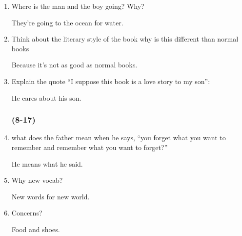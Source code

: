 {}

\begin{multicols}{3}
  \begin{enumerate}
    \subsubsection{(1-7)}

    \item Where is the man and the boy going? Why?
    
    They’re going to the ocean for water.
    
    \item Think about the literary style of the book why is this different than normal books
    
    Because it’s not as good as normal books.

    \item Explain the quote “I suppose this book is a love story to my son”:

    He cares about his son.
    
    \subsubsection{(8-17)}
    
    \item what does the father mean when he says, “you forget what you want to remember and remember what you want to forget?”

    He means what he said.

    \item Why new vocab?

    New words for new world.

    \item Concerns?

    Food and shoes.


\end{enumerate}
\end{multicols}

